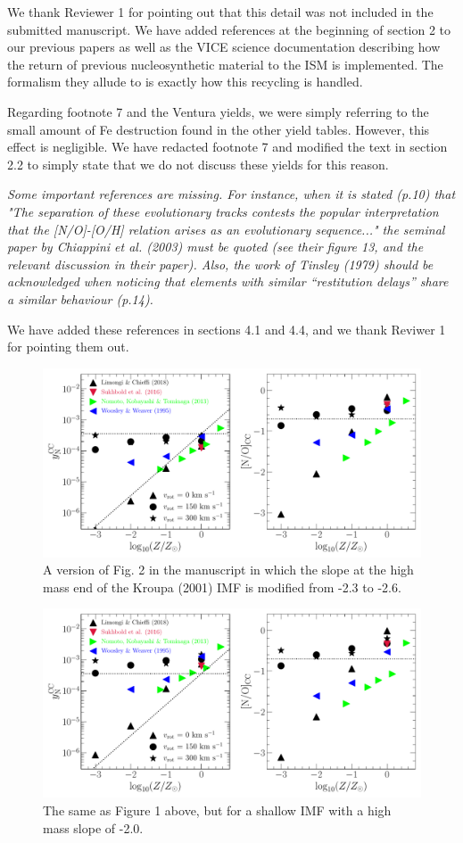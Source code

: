 \documentclass[12pt]{article}
\newcommand\doublebreak[0]{\par\null\par\noindent}
\begin{document}
\doublebreak
We thank Reviewer 1 for pointing out that this detail was not included in the
submitted manuscript.
We have added references at the beginning of section 2 to our previous papers
as well as the VICE science documentation describing how the return of previous
nucleosynthetic material to the ISM is implemented.
The formalism they allude to is exactly how this recycling is handled.
\par
Regarding footnote 7 and the Ventura yields, we were simply referring to the
small amount of Fe destruction found in the other yield tables.
However, this effect is negligible.
We have redacted footnote 7 and modified the text in section 2.2 to simply
state that we do not discuss these yields for this reason.
\doublebreak
\textit{%
Some important references are missing. For instance, when it is stated (p.10)
that "The separation of these evolutionary tracks contests the popular
interpretation that the [N/O]-[O/H] relation arises as an evolutionary
sequence..." the seminal paper by Chiappini et al. (2003) must be quoted (see
their figure 13, and the relevant discussion in their paper). Also, the work of
Tinsley (1979) should be acknowledged when noticing that elements with similar
``restitution delays'' share a similar behaviour (p.14).
}
\doublebreak
We have added these references in sections 4.1 and 4.4, and we thank Reviwer 1
for pointing them out.

\newpage
\begin{figure}[!h]
\centering
\includegraphics[scale = 0.6]{n_cc_yields_steep.pdf}
\caption{
A version of Fig. 2 in the manuscript in which the slope at the high mass end
of the Kroupa (2001) IMF is modified from -2.3 to -2.6.
}
\end{figure}
\begin{figure}[!h]
\centering
\includegraphics[scale = 0.6]{n_cc_yields_shallow.pdf}
\caption{
The same as Figure 1 above, but for a shallow IMF with a high mass slope of
-2.0.
}
\end{figure}
\end{document}
